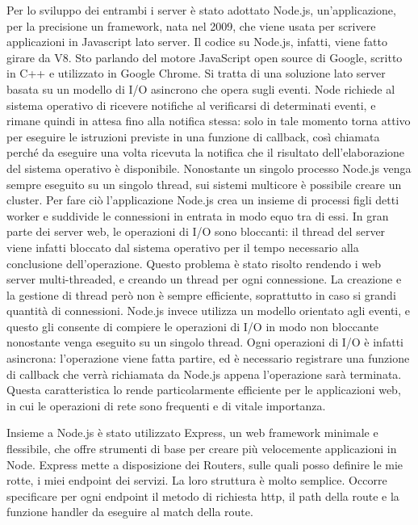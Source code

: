 Per lo sviluppo dei entrambi i server è stato adottato Node.js, un’applicazione, per la precisione un framework, nata nel 2009, che viene usata per scrivere applicazioni in Javascript lato server.
Il codice su Node.js, infatti, viene fatto girare da V8. Sto parlando del motore JavaScript open source di Google, scritto in C++ e utilizzato in Google Chrome. Si tratta di una soluzione lato server basata su un modello di I/O asincrono che opera sugli eventi. Node richiede al sistema operativo di ricevere notifiche al verificarsi di determinati eventi, e rimane quindi in attesa fino alla notifica stessa: solo in tale momento torna attivo per eseguire le istruzioni previste in una funzione di callback, così chiamata perché da eseguire una volta ricevuta la notifica che il risultato dell'elaborazione del sistema operativo è disponibile.
Nonostante un singolo processo Node.js venga sempre eseguito su un singolo thread, sui sistemi multicore è possibile creare un cluster. Per fare ciò l’applicazione Node.js crea un insieme di processi figli detti worker e suddivide le connessioni in entrata in modo equo tra di essi.
In gran parte dei server web, le operazioni di I/O sono bloccanti: il thread del server viene infatti bloccato dal sistema operativo per il tempo necessario alla conclusione dell’operazione. Questo problema è stato risolto rendendo i web server multi-threaded, e creando un thread per ogni connessione. La creazione e la gestione di thread però non è sempre efficiente, soprattutto in caso si grandi quantità di connessioni. Node.js invece utilizza un modello orientato agli eventi, e questo gli consente di compiere le operazioni di I/O in modo non bloccante nonostante venga eseguito su un singolo thread. Ogni operazioni di I/O è infatti asincrona: l’operazione viene fatta partire, ed è necessario registrare una funzione di callback che verrà richiamata da Node.js appena l’operazione sarà terminata. Questa caratteristica lo rende particolarmente efficiente per le applicazioni web, in cui le operazioni di rete sono frequenti e di vitale importanza.

Insieme a Node.js è stato utilizzato Express, un web framework minimale e flessibile, che offre strumenti di base per creare più velocemente applicazioni in Node.
Express mette a disposizione dei Routers, sulle quali posso definire le mie rotte, i miei endpoint dei servizi. La loro struttura è molto semplice. Occorre specificare per ogni endpoint il metodo di richiesta http, il path della route e la funzione handler da eseguire al match della route.  

